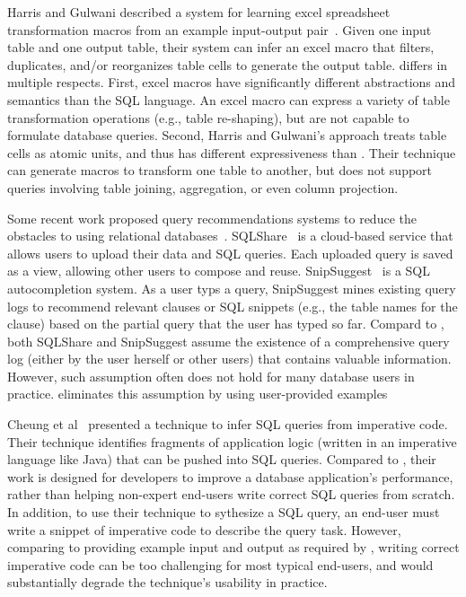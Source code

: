 Harris and Gulwani described a system for learning excel
spreadsheet transformation macros from an example
input-output pair~\cite{Harris:2011}. Given one input table and one output
table, their system can infer an excel macro that filters,
duplicates, and/or reorganizes table cells to generate the output table.
\ourtool differs in multiple respects.
First, excel macros have significantly different
abstractions and semantics than the SQL language.
An excel macro can express a variety of table transformation operations
(e.g., table re-shaping), but are not capable to formulate database queries.
Second, Harris and Gulwani's approach treats table cells
as atomic units, and thus has different expressiveness
than \ourtool. Their technique can generate macros to
transform one table to another, but does not support queries
involving table joining, aggregation, or even column projection.




Some recent work proposed query recommendations systems to reduce
the obstacles to using relational databases~\cite{Howe:2011, Khoussainova:2010}. 
SQLShare~\cite{Howe:2011} is a cloud-based service that allows
users to upload their data and SQL queries. 
Each uploaded query is saved as a view, allowing other users
to compose and reuse. SnipSuggest~\cite{Khoussainova:2010} is a SQL autocompletion
system. As a user typs a query, SnipSuggest mines existing query
logs to recommend relevant clauses or SQL snippets (e.g., the table
names for the  clause) based on the partial query that
the user has typed so far.
Compard to \ourtool, both SQLShare and SnipSuggest assume the
existence of a comprehensive query log (either by the user herself or other users)
that contains valuable information.
However, such assumption often does not hold for many database users in practice.
\ourtool eliminates this assumption by using user-provided
examples 


Cheung et al~\cite{abs-1208-2013} presented a technique to infer SQL
queries from imperative code. Their technique identifies
fragments of application logic (written in an imperative language
like Java) that can be pushed into SQL queries. 
Compared to \ourtool, their work is designed for developers
to improve a database application's performance,
rather than helping non-expert end-users
write correct SQL queries from scratch. In addition,
to use their technique to sythesize a SQL query, 
an end-user must write a snippet of imperative code to
describe the query task. However, comparing to providing 
example input and output as required by \ourtool, writing correct imperative code
can be too challenging for most typical end-users, and would
substantially degrade the technique's usability in practice.


